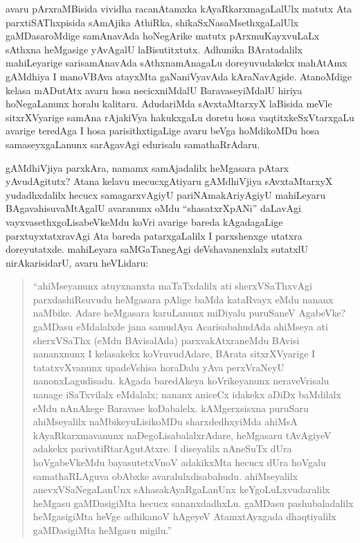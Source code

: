 avaru pArxraMBisida vividha racanAtamxka kAyaRkarxmagaLalUlx matutx Ata parxtiSAThxpisida sAmAjika AthiRka, shikaSxNasaMsethxgaLalUlx gaMDasaroMdige samAnavAda hoNegArike matutx pArxmuKayxvuLaLx sAthxna heMgasige yAvAgalU laBisutitxtutx. Adhunika BAratadalilx mahiLeyarige sarisamAnavAda sAthxnamAnagaLu doreyuvudakekx mahAtAmx gAMdhiya I manoVBAva atayxMta gaNaniVyavAda kAraNavAgide. AtanoMdige kelasa mADutAtx avaru hosa necicxniMdalU BaravaseyiMdalU hiriya hoNegaLanunx horalu kalitaru. AdudariMda sAvxtaMtarxyX laBisida meVle sitxrXVyarige samAna rAjakiVya hakukxgaLu doretu hosa vaqtitxkeSxVtarxgaLu avarige teredAga I hosa parisithxtigaLige avaru beVga hoMdikoMDu hosa samaseyxgaLanunx sarAgavAgi edurisalu samathaRrAdaru.

gAMdhiVjiya parxkAra, namamx samAjadalilx heMgasara pAtarx yAvudAgitutx? Atana kelavu mecucxgAtiyaru gAMdhiVjiya sAvxtaMtarxyX yudadhxdalilx hecucx samagarxvAgiyU pariNAmakAriyAgiyU mahiLeyaru BAgavahisuvaMtAgalU avaranunx oMdu ``shasatxrXpANi'' daLavAgi vayxvasethxgoLisabeVkeMdu koVri avarige bareda kAgadagaLige parxtuyxtatxravAgi Ata bareda patarxgaLalilx I parxshenxge utatxra doreyutatxde. mahiLeyara saMGaTanegAgi deVshavanenxlalx sutatxlU nirAkarisidarU, avaru heVLidaru:
\begin{quote}
``ahiMseyanunx atuyxnanxta maTaTxdalilx ati sherxVSaThxvAgi parxdashiRsuvudu heMgasara pAlige baMda kataRvayx eMdu nananx naMbike. Adare heMga\-sara karuLanunx miDiyalu puruSaneV AgabeVke? gaMDasu eMdalalxde jana samudAya AcarisabahudAda ahiMseya ati sherxVSaThx (eMdu BAvisa\-lAda) parxvakAtxraneMdu BAvisi nananxnunx I kelasakekx koVruvu\-dAdare, BArata sitxrXVyarige I tatatxvXvanunx upadeVshisa horaDalu yAva perxVra\-NeyU nanonxLagudisadu. kAgada baredAkeya koVrikeyanunx nera\-veVrisalu nanage iSaTxvilalx eMdalalx; nananx aniceCx idakekx aDiDx \hbox{baMdilalx} eMdu nAnAkege Baravase koDabalelx. kAMgerxsisxna puruSaru ahiMseyalilx naMbikeyuLisikoMDu sharxdedhxyiMda ahiMsA kAyaRkarxmavanunx naDe\-goLisabalalxrAdare, heMgasaru tAvAgiyeV adakekx parivatiRtarAgutAtxre. I diseyalilx nAneSuTx dUra hoVgabeVkeMdu bayasutetxVnoV adakikxMta hecucx dUra hoVgalu samathaRLAguva obAbxke avaralulxdisabahudu. ahiMseyalilx anevxVSaNegaLanUnx sAhasakAyaRgaLanUnx keYgoLuLxvuda\-ralilx heMgasu gaMDasigiMta hecucx sananxdadhxLu. gaMDasu pashubaladalilx heMgasi\-giMta heVge adhikanoV hAgeyeV AtamxtAyxgada dhaqtiyalilx gaMDasigiMta heMgasu migilu.''
\end{quote}

